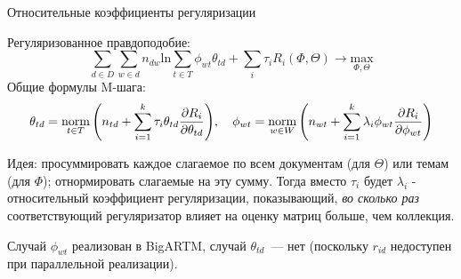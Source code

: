 \begin{frame}[t]{Относительные коэффициенты регуляризации}

Регуляризованное правдоподобие:
\[
    \sum_{d \in D} \sum_{w \in d} n_{dw} \mathrm{ln} \sum_{t \in T} \phi_{wt} \theta_{td} + \sum_{i} \tau_i R_i(\Phi, \Theta)
    \rightarrow \underset{\Phi, \Theta}{\mathrm{max}}
\]
Общие формулы M-шага:
\[
\theta_{td} = \mathop{\mathrm{norm}}\limits_{t \in T} \Bigg(
    n_{td} + \sum_{i=1}^k \tau_i \theta_{td} \frac{\partial R_i}{\partial \theta_{td}}
\Bigg), \quad \phi_{wt} = \mathop{\mathrm{norm}}\limits_{w \in W}\Bigg(
    n_{wt} + \sum_{i=1}^k \lambda_i 
    \phi_{wt} \frac{\partial R_i}{\partial \phi_{wt}}
\Bigg)
\]

\small
Идея: просуммировать каждое слагаемое по всем документам (для $\Theta$) или темам (для $\Phi$); отнормировать слагаемые на эту сумму. Тогда вместо $\tau_i$ будет  $\lambda_i$ - относительный коэффициент регуляризации, показывающий, \emph{во сколько раз} соответствующий регуляризатор влияет на оценку матриц больше, чем коллекция.

Случай $\phi_{wt}$ реализован в BigARTM, случай $\theta_{td}$~--- нет (поскольку $r_{id}$ недоступен при параллельной реализации).


\end{frame}

